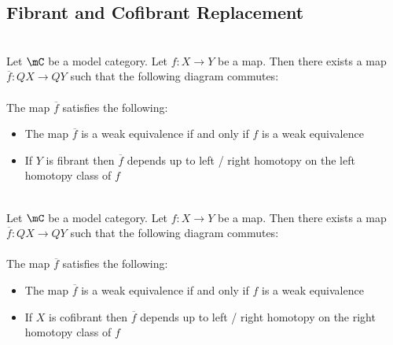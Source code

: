 \documentclass[a4paper]{article}
\begin{document}
\subsection{Fibrant and Cofibrant Replacement}
\begin{prp}{}{}\\ Let $\mC$ be a model category. Let $f:X\to Y$ be a map. Then there exists a map $\overline{f}:QX\to QY$ such that the following diagram commutes: \\
\\
The map $\overline{f}$ satisfies the following: 
\begin{itemize}
\item The map $\overline{f}$ is a weak equivalence if and only if $f$ is a weak equivalence
\item If $Y$ is fibrant then $\overline{f}$ depends up to left / right homotopy on the left homotopy class of $f$
\end{itemize}
\end{prp}

\begin{prp}{}{}\\ Let $\mC$ be a model category. Let $f:X\to Y$ be a map. Then there exists a map $\overline{f}:QX\to QY$ such that the following diagram commutes: \\
\\
The map $\overline{f}$ satisfies the following: 
\begin{itemize}
\item The map $\overline{f}$ is a weak equivalence if and only if $f$ is a weak equivalence
\item If $X$ is cofibrant then $\overline{f}$ depends up to left / right homotopy on the right homotopy class of $f$
\end{itemize}
\end{prp}
\end{document}
